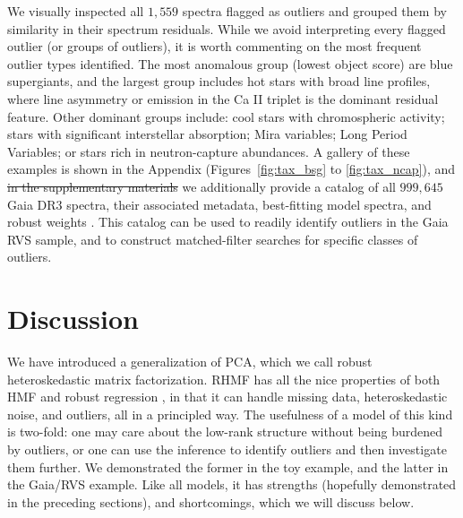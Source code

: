 \documentclass[onecolumn,floatfix,linenumbers,trackchanges]{aastex631}
\providecommand{\added}{}\renewcommand{\added}[1]{{\color{blue}#1}}
\providecommand{\removed}{}\renewcommand{\removed}[1]{{\color{red}\st{#1}}}
\begin{document}
We visually inspected all $1{,}559$ spectra flagged as outliers and grouped them by similarity in their spectrum residuals. While we avoid interpreting every flagged outlier (or groups of outliers), it is worth commenting on the most frequent outlier types identified. The most anomalous group (lowest object score) are blue supergiants, and the largest group includes hot stars with broad line profiles, where line asymmetry or emission in the Ca II triplet is the dominant residual feature. Other dominant groups include: cool stars with chromospheric activity; stars with significant interstellar absorption; Mira variables; Long Period Variables; or stars rich in neutron-capture abundances. 
A gallery of these examples is shown in the Appendix (Figures~\ref{fig:tax_bsg} to \ref{fig:tax_ncap}), and \removed{in the supplementary materials} we \added{additionally} provide a catalog of all $999{,}645$ Gaia DR3 spectra, their associated metadata, best-fitting model spectra, and robust weights \added{\citep{hilder2026catalogue}}. 
This catalog can be used to readily identify outliers in the Gaia RVS sample, and to construct matched-filter searches for specific classes of outliers.

\section{Discussion} \label{sec:discussion}

We have introduced a generalization of PCA, which we call robust heteroskedastic matrix factorization.
RHMF has all the nice properties of both HMF \citep{tsalmantza2012} and robust regression \citep{holland1977, hoaglin1983}, in that it can handle missing data, heteroskedastic noise, and outliers, all in a principled way.
The usefulness of a model of this kind is two-fold: one may care about the low-rank structure without being burdened by outliers, or one can use the inference to identify outliers and then investigate them further.
We demonstrated the former in the toy example, and the latter in the Gaia/RVS example.
Like all models, it has strengths (hopefully demonstrated in the preceding sections), and shortcomings, which we will discuss below.

\end{document}
